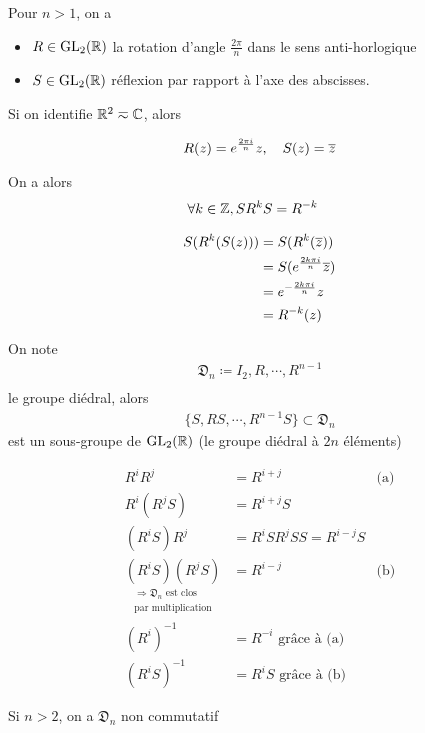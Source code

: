 \documentclass[french,a4paper,10pt]{article}
\begin{document}
	\begin{example}
		Pour $n>1$, on a
		\begin{itemize}[]
			\item 
			$R\in \text{GL}_{2}(\mathbb{R})$ la rotation d'angle $\frac{2\pi}n$ dans le sens anti-horlogique
			
			\item 
			$S\in \text{GL}_{2}(\mathbb{R})$ réflexion par rapport à l'axe des abscisses. 
		\end{itemize}
			
			Si on identifie $\mathbb{R}^2\eqsim\mathbb{C}$, alors
			
			\[\begin{aligned}
				R(z)=e^{\frac{2\pi i}n} z,\quad S(z)=\overline{z}
			\end{aligned}\]
			
			On a alors 
			\[\begin{aligned}
				\forall k\in\mathbb{Z}, SR^kS&=R^{-k}
			\end{aligned}\]
			
			\begin{myproof}
				\[\begin{aligned}
					S(R^k(S(z)))&=S(R^k(\overline{z}))\\
					&=S(e^{\frac{2k\pi i}n}\overline{z})\\
					&=e^{-\frac{2k\pi i}n}z\\
					&= R^{-k}(z)
				\end{aligned}\]
			\end{myproof}
			
			\begin{proposition}
			On note
			\[\begin{aligned}
				\mathfrak{D}_n\coloneq {I_2, R, \cdots, R^{n-1}}\\
			\end{aligned}\]
			le groupe diédral, alors
			\[\begin{aligned}
				\{S, RS, \cdots, R^{n-1}S\} \subset \mathfrak D_n
			\end{aligned}\]
			est un sous-groupe de $\text{GL}_{2}(\mathbb{R})$ (le groupe diédral à $2n$ éléments)
			\end{proposition}
			\begin{myproof}
			
			\[\begin{aligned}
				R^iR^j&=R^{i+j}&\text{(a)}\\
				R^i(R^jS)&=R^{i+j}S\\
				(R^iS)R^j&=R^iSR^jSS=R^{i-j}S\\
				\underset{\substack{\Longrightarrow \mathfrak D_n\text{ est clos}\\ \text{par multiplication}}}{(R^iS)(R^jS)}&=R^{i-j}&\text{(b)}\\
				(R^i)^{-1}&=R^{-i}\text{ grâce à (a)}\\
				(R^iS)^{-1}&=R^iS\text{ grâce à (b)}
			\end{aligned}\]
			\end{myproof}
			
			\begin{remark}
				Si $n>2$, on a $\mathfrak{D}_n$ non commutatif
			\end{remark}
	\end{example}
	
\end{document}
